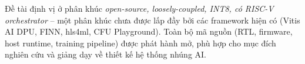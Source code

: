 Đề tài định vị ở phân khúc \textit{open-source, loosely-coupled, INT8, có RISC-V orchestrator} -- một phân khúc chưa được lấp đầy bởi các framework hiện có (Vitis AI DPU, FINN, hls4ml, CFU Playground). Toàn bộ mã nguồn (RTL, firmware, host runtime, training pipeline) được phát hành mở, phù hợp cho mục đích nghiên cứu và giảng dạy về thiết kế hệ thống nhúng AI.




